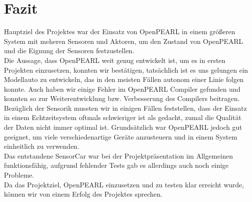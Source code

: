 \chapter{Fazit}

Hauptziel des Projektes war der Einsatz von OpenPEARL in einem größeren System mit meheren Sensoren und Aktoren, um den Zustand von OpenPEARL und die Eignung der Sensoren festzustellen.\\
Die Aussage, dass OpenPEARL weit genug entwickelt ist, um es in ersten Projekten einzusetzen, konnten wir bestätigen, tatsächlich ist es uns gelungen ein Modellauto zu entwickeln, das in den meisten Fällen autonom einer Linie folgen konnte. Auch haben wir einige Fehler im OpenPEARL Compiler gefunden und konnten so zur Weiterentwicklung bzw. Verbesserung des Compilers beitragen.\\
Bezüglich der Sensorik mussten wir in einigen Fällen feststellen, dass der Einsatz in einem Echtzeitsystem oftmals schwieriger ist als gedacht, zumal die Qualität der Daten nicht immer optimal ist. Grundsätzlich war OpenPEARL jedoch gut geeignet, um viele verschiedenartige Geräte anzusteuern und in einem System einheitlich zu verwenden.\\
Das entstandene SensorCar war bei der Projektpräsentation im Allgemeinen funktionsfähig, aufgrund fehlender Tests gab es allerdings auch noch einige Probleme.\\
Da das Projektziel, OpenPEARL einzusetzen und zu testen klar erreicht wurde, können wir von einem Erfolg des Projektes sprechen.
